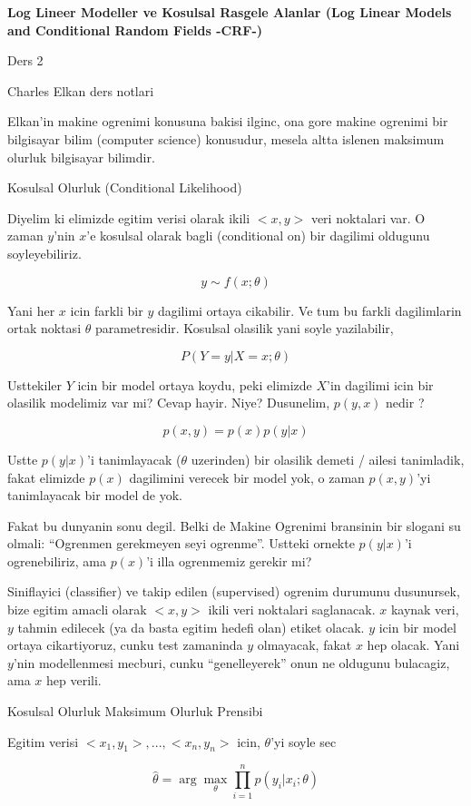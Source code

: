 \documentclass[12pt,fleqn]{article}\usepackage{../common}
\begin{document}
\textbf{Log Lineer Modeller ve Kosulsal Rasgele Alanlar (Log Linear Models and
Conditional Random Fields -CRF-)}

Ders 2

Charles Elkan ders notlari

Elkan'in makine ogrenimi konusuna bakisi ilginc, ona gore makine ogrenimi
bir bilgisayar bilim (computer science) konusudur, mesela altta islenen
maksimum olurluk bilgisayar bilimdir. 

Kosulsal Olurluk (Conditional Likelihood)

Diyelim ki elimizde egitim verisi olarak ikili $<x,y>$ veri noktalari
var. O zaman $y$'nin $x$'e kosulsal olarak bagli (conditional on) bir
dagilimi oldugunu soyleyebiliriz. 

$$ y \sim f(x;\theta) $$

Yani her $x$ icin farkli bir $y$ dagilimi ortaya cikabilir. Ve tum bu
farkli dagilimlarin ortak noktasi $\theta$ parametresidir. Kosulsal
olasilik yani soyle yazilabilir, 

$$ P(Y=y | X=x;\theta) $$

Usttekiler $Y$ icin bir model ortaya koydu, peki elimizde $X$'in dagilimi
icin bir olasilik modelimiz var mi? Cevap hayir. Niye? Dusunelim, $p(y,x)$
nedir ?

$$ p(x,y) = p(x)p(y|x) $$

Ustte $p(y|x)$'i tanimlayacak ($\theta$ uzerinden) bir olasilik demeti /
ailesi tanimladik, fakat elimizde $p(x)$ dagilimini verecek bir model
yok, o zaman $p(x,y)$'yi tanimlayacak bir model de yok.

Fakat bu dunyanin sonu degil. Belki de Makine Ogrenimi bransinin bir
slogani su olmali: ``Ogrenmen gerekmeyen seyi ogrenme''. Ustteki ornekte
$p(y|x)$'i ogrenebiliriz, ama $p(x)$'i illa ogrenmemiz gerekir mi?

Siniflayici (classifier) ve takip edilen (supervised) ogrenim durumunu
dusunursek, bize egitim amacli olarak $<x,y>$ ikili veri noktalari
saglanacak. $x$ kaynak veri, $y$ tahmin edilecek (ya da basta egitim hedefi
olan) etiket olacak. $y$ icin bir model ortaya cikartiyoruz, cunku test
zamaninda $y$ olmayacak, fakat $x$ hep olacak. Yani $y$'nin modellenmesi
mecburi, cunku ``genelleyerek'' onun ne oldugunu bulacagiz, ama $x$ hep
verili.

Kosulsal Olurluk Maksimum Olurluk Prensibi

Egitim verisi $<x_1,y_1>,...,<x_n,y_n>$ icin, $\theta$'yi soyle sec

$$ \hat{\theta} =  \arg\max_{\theta} \prod _{i=1}^{n} p(y_i | x_i;\theta) $$
\end{document}
